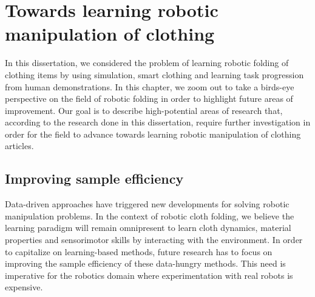 \documentclass[\home/main.tex]{subfiles}
\begin{document}

\chapter{Towards learning robotic manipulation of clothing}\label{ch:towards_robotic_folding}

In this dissertation, we considered the problem of learning robotic folding of clothing items by using simulation, smart clothing and learning task progression from human demonstrations. In this chapter, we zoom out to take a birds-eye perspective on the field of robotic folding in order to highlight future areas of improvement. Our goal is to describe high-potential areas of research that, according to the research done in this dissertation, require further investigation in order for the field to advance towards learning robotic manipulation of clothing articles.

\section{Improving sample efficiency}

Data-driven approaches have triggered new developments for solving robotic manipulation problems. In the context of robotic cloth folding, we believe the learning paradigm will remain omnipresent to learn cloth dynamics, material properties and sensorimotor skills by interacting with the environment. In order to capitalize on learning-based methods, future research has to focus on improving the sample efficiency of these data-hungry methods. This need is imperative for the robotics domain where experimentation with real robots is expensive. 
\end{document}
